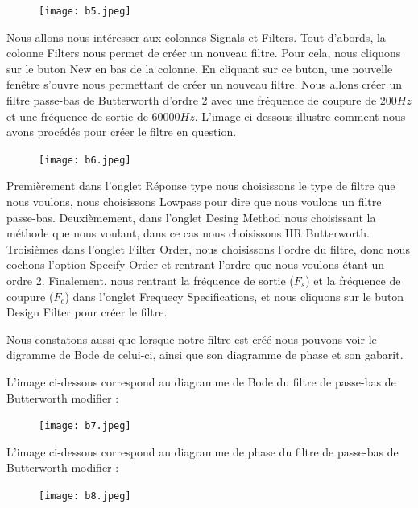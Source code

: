 \documentclass[conference,onecolumn]{IEEEtran}
\begin{document}
 \begin{figure}[H]
 \centering
    \texttt{[image: b5.jpeg]}
\end{figure}


Nous allons nous intéresser aux colonnes Signals et Filters. Tout d'abords, la colonne Filters nous permet de créer un nouveau filtre. Pour cela, nous cliquons sur le buton New en bas de la colonne. En cliquant sur ce buton, une nouvelle fenêtre s'ouvre nous permettant de créer un nouveau filtre. Nous allons créer un filtre passe-bas de Butterworth d'ordre 2 avec une fréquence de coupure de $200 Hz$ et une fréquence de sortie de $60000 Hz$. L'image ci-dessous illustre comment nous avons procédés pour créer le filtre en question.

 \begin{figure}[H]
 \centering
    \texttt{[image: b6.jpeg]}
\end{figure}


Premièrement dans l'onglet Réponse type nous choisissons le type de filtre que nous voulons, nous choisissons Lowpass pour dire que nous voulons un filtre passe-bas. Deuxièmement, dans l'onglet Desing Method nous choisissant la méthode que nous voulant, dans ce cas nous choisissons IIR Butterworth. Troisièmes dans l'onglet Filter Order, nous choisissons l'ordre du filtre, donc nous cochons l'option Specify Order et rentrant l'ordre que nous voulons étant un ordre 2. Finalement, nous rentrant la fréquence de sortie ($F_s$) et la fréquence de coupure ($F_c$) dans l'onglet Frequecy Specifications, et nous cliquons sur le buton Design Filter pour créer le filtre. 

Nous constatons aussi que lorsque notre filtre est créé nous pouvons voir le digramme de Bode de celui-ci, ainsi que son diagramme de phase et son gabarit. 

L'image ci-dessous correspond au diagramme de Bode du filtre de passe-bas de Butterworth modifier :

 \begin{figure}[H]
 \centering
    \texttt{[image: b7.jpeg]}
\end{figure}


L'image ci-dessous correspond au diagramme de phase du filtre de passe-bas de Butterworth modifier :

 \begin{figure}[H]
 \centering
    \texttt{[image: b8.jpeg]}
\end{figure}
\end{document}
